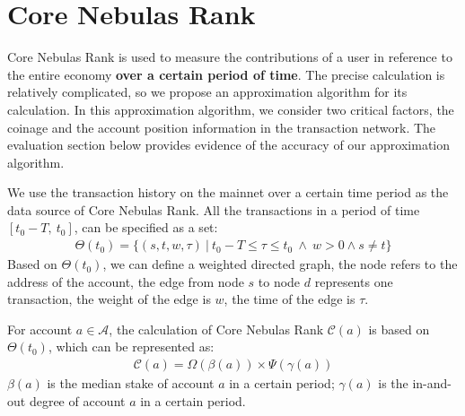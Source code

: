 \section{Core Nebulas Rank}

Core Nebulas Rank is used to measure the contributions of a user in reference to the entire economy {\textbf{over a certain period of time}}.
The precise calculation is relatively complicated, so we propose an approximation algorithm for its calculation.
In this approximation algorithm, we consider two critical factors, the coinage and the account position information in the transaction network. The evaluation section below provides evidence of the accuracy of our approximation algorithm.

We use the transaction history on the mainnet over a certain time period as the data source of Core Nebulas Rank.
All the transactions in a period of time $[t_0-T,\ t_0]$, can be specified as a set:
\begin{align}
\Theta(t_0) = \{(s, t, w, \tau)\ |\ t_0 - T \le \tau \le t_0\ \land \ w > 0 \land s \neq t \}
\end{align}
\noindent Based on $\Theta(t_0)$, we can define a weighted directed graph, the node refers to the address of the account, the edge from node $s$ to node $d$ represents one transaction,
the weight of the edge is $w$, the time of the edge is $\tau$.

For account $a \in \mathcal{A}$, the calculation of Core Nebulas Rank $\mathcal{C}(a)$ is based on $\Theta(t_0)$, which can be represented as:
\begin{align}
\mathcal{C}(a) = \Omega(\beta(a)) \times{} \Psi(\gamma(a))
\label{eq:rank}
\end{align}
\noindent $\beta(a)$ is the median stake of account $a$ in a certain period; $\gamma(a)$ is the in-and-out degree of account $a$ in a certain period.



